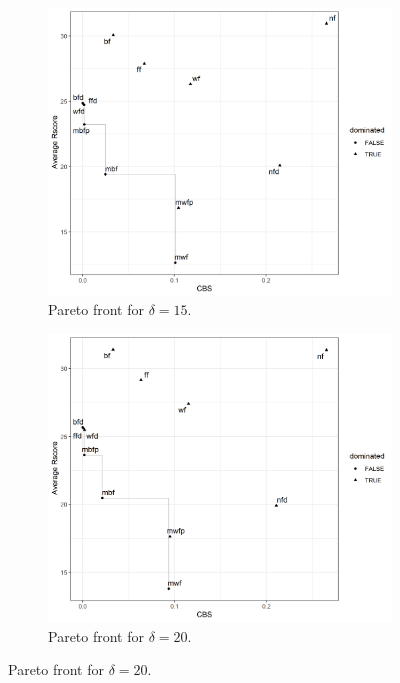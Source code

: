 \begin{figure}[H]
\begin{subfigure}{0.3\textwidth}
    \end{subfigure}
    \begin{subfigure}{0.3\textwidth}
        \includegraphics[width=\textwidth]{images/controller/pareto_front/15.png}
        \caption{Pareto front for $\delta = 15$.}
    \end{subfigure}
    \begin{subfigure}{0.3\textwidth}
        \includegraphics[width=\textwidth]{images/controller/pareto_front/20.png}
        \caption{Pareto front for $\delta = 20$.}
    \end{subfigure}

\end{figure}
